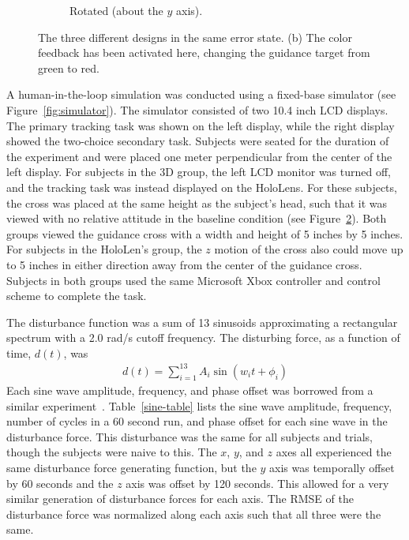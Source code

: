 \begin{figure}[t!]
\begin{center}
\begin{subfigure}{0.32\textwidth}
            \caption[Rotated (about the $y$ axis)]{Rotated (about the $y$ axis).}
            \label{fig:designs_rotated}
        \end{subfigure}
        \caption[The three different designs in the same error state]{The three different designs in the same error state.
            (b) The color feedback has been activated here, changing the guidance target from green to red.}
        \label{fig:designs}%
    \end{center}
\end{figure}

A human-in-the-loop simulation was conducted using a fixed-base simulator (see Figure~\ref{fig:simulator}).
The simulator consisted of two 10.4 inch LCD displays.
The primary tracking task was shown on the left display, while the right display showed the two-choice secondary task.
Subjects were seated for the duration of the experiment and were placed one meter perpendicular from the center of the left display.
For subjects in the 3D group, the left LCD monitor was turned off, and the tracking task was instead displayed on the HoloLens.
For these subjects, the cross was placed at the same height as the subject's head, such that it was viewed with no relative attitude in the baseline condition (see Figure~\ref{fig:designs}).
Both groups viewed the guidance cross with a width and height of 5 inches by 5 inches.
For subjects in the HoloLen's group, the $z$ motion of the cross also could move up to 5 inches in either direction away from the center of the guidance cross.
Subjects in both groups used the same Microsoft Xbox controller and control scheme to complete the task.

The disturbance function was a sum of 13 sinusoids approximating a rectangular spectrum with a 2.0 rad/s cutoff frequency.
The disturbing force, as a function of time, $d(t)$, was
\begin{align}
    d(t) = \sum_{i=1}^{13} A_i \sin \left( w_i t + \phi_i \right)
    \label{eq:disturbance}
\end{align}
Each sine wave amplitude, frequency, and phase offset was borrowed from a similar experiment~\citep{hess_effects_1984}.
Table~\ref{sine-table} lists the sine wave amplitude, frequency, number of cycles in a 60 second run, and phase offset for each sine wave in the disturbance force.
This disturbance was the same for all subjects and trials, though the subjects were naive to this.
The $x$, $y$, and $z$ axes all experienced the same disturbance force generating function, but the $y$ axis was temporally offset by 60 seconds and the $z$ axis was offset by 120 seconds.
This allowed for a very similar generation of disturbance forces for each axis.
The RMSE of the disturbance force was normalized along each axis such that all three were the same.

